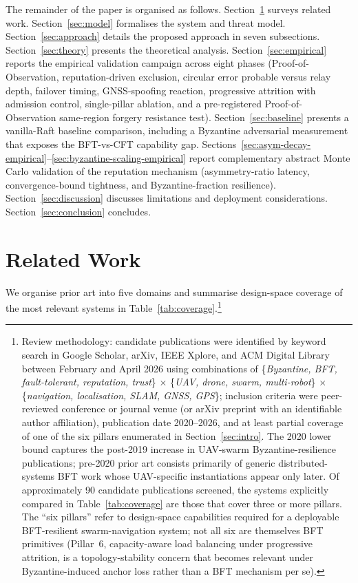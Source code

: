 \documentclass[journal,10pt,twocolumn]{IEEEtran}
\begin{document}
The remainder of the paper is organised as follows. Section~\ref{sec:related} surveys related work. Section~\ref{sec:model} formalises the system and threat model. Section~\ref{sec:approach} details the proposed approach in seven subsections. Section~\ref{sec:theory} presents the theoretical analysis. Section~\ref{sec:empirical} reports the empirical validation campaign across eight phases (Proof-of-Observation, reputation-driven exclusion, circular error probable versus relay depth, failover timing, GNSS-spoofing reaction, progressive attrition with admission control, single-pillar ablation, and a pre-registered Proof-of-Observation same-region forgery resistance test). Section~\ref{sec:baseline} presents a vanilla-Raft baseline comparison, including a Byzantine adversarial measurement that exposes the BFT-vs-CFT capability gap. Sections~\ref{sec:asym-decay-empirical}--\ref{sec:byzantine-scaling-empirical} report complementary abstract Monte Carlo validation of the reputation mechanism (asymmetry-ratio latency, convergence-bound tightness, and Byzantine-fraction resilience). Section~\ref{sec:discussion} discusses limitations and deployment considerations. Section~\ref{sec:conclusion} concludes.

\section{Related Work}
\label{sec:related}

We organise prior art into five domains and summarise design-space coverage of the most relevant systems in Table~\ref{tab:coverage}.\footnote{Review methodology: candidate publications were identified by keyword search in Google Scholar, arXiv, IEEE Xplore, and ACM Digital Library between February and April 2026 using combinations of \{\emph{Byzantine, BFT, fault-tolerant, reputation, trust}\} $\times$ \{\emph{UAV, drone, swarm, multi-robot}\} $\times$ \{\emph{navigation, localisation, SLAM, GNSS, GPS}\}; inclusion criteria were peer-reviewed conference or journal venue (or arXiv preprint with an identifiable author affiliation), publication date 2020--2026, and at least partial coverage of one of the six pillars enumerated in Section~\ref{sec:intro}. The 2020 lower bound captures the post-2019 increase in UAV-swarm Byzantine-resilience publications; pre-2020 prior art consists primarily of generic distributed-systems BFT work whose UAV-specific instantiations appear only later. Of approximately 90 candidate publications screened, the systems explicitly compared in Table~\ref{tab:coverage} are those that cover three or more pillars. The ``six pillars'' refer to design-space capabilities required for a deployable BFT-resilient swarm-navigation system; not all six are themselves BFT primitives (Pillar~6, capacity-aware load balancing under progressive attrition, is a topology-stability concern that becomes relevant under Byzantine-induced anchor loss rather than a BFT mechanism per se).}
\end{document}
